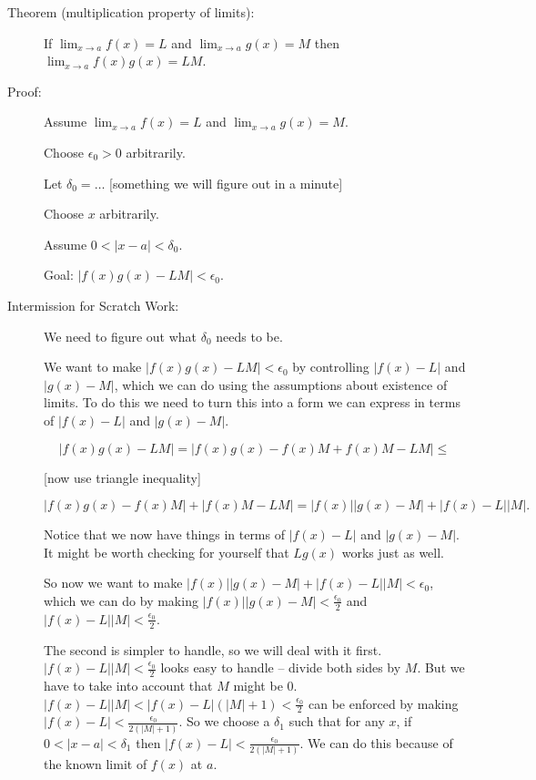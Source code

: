 \documentclass[12pt]{article}
\begin{document}
\begin{description}

\item[Theorem (multiplication property of limits):]  If $\lim_{x \rightarrow a}f(x)=L$ and $\lim_{x \rightarrow a}g(x)=M$ then 
$\lim_{x \rightarrow a}f(x)g(x)=LM$.

\item[Proof:]  Assume $\lim_{x \rightarrow a}f(x)=L$ and $\lim_{x \rightarrow a}g(x)=M$.

Choose $\epsilon_0>0$ arbitrarily.

Let $\delta_0=\ldots$ [something we will figure out in a minute]

Choose $x$ arbitrarily.

Assume $0<|x-a|<\delta_0$.

Goal:  $|f(x)g(x)-LM|<\epsilon_0$.

\item[Intermission for Scratch Work:]

We need to figure out what $\delta_0$ needs to be.

We want to make $|f(x)g(x)-LM|<\epsilon_0$ by controlling $|f(x)-L|$ and $|g(x)-M|$, which we can do using the assumptions about existence of limits.  To do this we need to turn this into a form we can express in terms of $|f(x)-L|$ and $|g(x)-M|$.

$$|f(x)g(x)-LM| = |f(x)g(x)-f(x)M+f(x)M-LM| \leq$$

 [now use triangle inequality] 

$$|f(x)g(x)-f(x)M|+|f(x)M-LM|=|f(x)||g(x)-M| + |f(x)-L||M|.$$

Notice that we now have things in terms of $|f(x)-L|$ and $|g(x)-M|$.  It might be worth checking for yourself that
$Lg(x)$ works just as well.

So now we want to make $|f(x)||g(x)-M| + |f(x)-L||M|<\epsilon_0$, which we can do by making $|f(x)||g(x)-M|<\frac{\epsilon_0}2$ and $|f(x)-L||M|<\frac{\epsilon_0}2$.

The second is simpler to handle, so we will deal with it first.  $|f(x)-L||M|<\frac{\epsilon_0}2$ looks easy to
handle -- divide both sides by $M$.  But we have to take into account that $M$ might be 0.  $|f(x)-L||M| < |f(x)-L|(|M| +1) <\frac{\epsilon_0}2$
can be enforced by making $|f(x)-L|<\frac{\epsilon_0}{2(|M|+1)}$.
So we choose a $\delta_1$ such that for any $x$, if $0<|x-a|<\delta_1$ then $|f(x)-L|<\frac{\epsilon_0}{2(|M|+1)}$.  We can do this because of the known limit of $f(x)$ at $a$.


\end{description}
\end{document}
